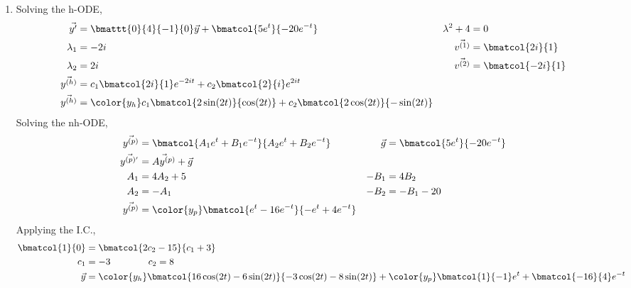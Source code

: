 \begin{enumerate}
    \item Solving the h-ODE,
          \begin{align}
              \vec{y'}                    & = \bmattt{0}{4}{-1}{0} \vec{y}
              + \bmatcol{5e^t}{-20e^{-t}} &
              \lambda^{2} + 4             & = 0                              \\
              \lambda_1                   & = -2i                          &
              \vec{v^{(1)}}               & = \bmatcol{2i}{1}                \\
              \lambda_2                   & = 2i                           &
              \vec{v^{(2)}}               & = \bmatcol{-2i}{1}               \\
              \vec{y^{(h)}}               & = c_1 \bmatcol{2i}{1}e^{-2it}
              + c_2 \bmatcol{2}{i} e^{2it}                                   \\
              \vec{y^{(h)}}               & = \color{y_h}
              c_1 \bmatcol{2\sin(2t)}{\cos(2t)}
              + c_2 \bmatcol{2\cos(2t)}{-\sin(2t)}
          \end{align}
          Solving the nh-ODE,
          \begin{align}
              \vec{y^{(p)}}            & = \bmatcol{A_1 e^{t} + B_1 e^{-t}}
              {A_2 e^{t} + B_2 e^{-t}} &
              \vec{g}                  & = \bmatcol{5 e^{t}}{-20 e^{-t}}      \\
              \vec{y^{(p)'}}           & = \vec{Ay^{(p)}} + \vec{g}           \\
              A_1                      & = 4A_2 + 5                         &
              -B_1                     & = 4B_2                               \\
              A_2                      & = -A_1                             &
              -B_2                     & = -B_1 - 20                          \\
              \vec{y^{(p)}}            & = \color{y_p}
              \bmatcol{e^t - 16e^{-t}}{-e^{t} + 4e^{-t}}
          \end{align}
          Applying the I.C.,
          \begin{align}
              \bmatcol{1}{0} & = \bmatcol{2c_2 - 15}{c_1 + 3} \\
              c_1            & = -3 \qquad\qquad c_2 = 8      \\
              \vec{y}        & = {\color{y_h}
              \bmatcol{16\cos(2t) - 6\sin(2t)}{-3\cos(2t) - 8\sin(2t)}}
              + {\color{y_p} \bmatcol{1}{-1}e^{t}
              + \bmatcol{-16}{4}e^{-t}}
          \end{align}


\end{enumerate}
